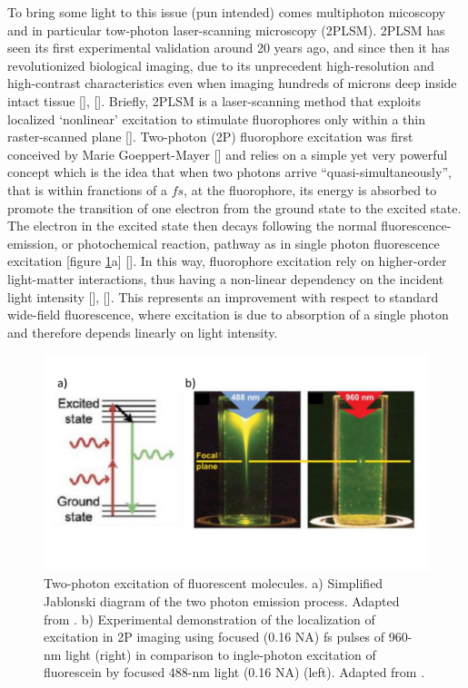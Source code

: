 To bring some light to this issue (pun intended) comes multiphoton micoscopy and in particular tow-photon laser-scanning microscopy (2PLSM).
2PLSM has seen its first experimental validation around 20 years ago, and since then it has revolutionized biological imaging, due to its unprecedent high-resolution and high-contrast characteristics even when imaging hundreds of microns deep inside intact tissue [\cite{denk1994}], [\cite{helmchen2005}].
Briefly, 2PLSM is a laser-scanning method that exploits localized ‘nonlinear’ excitation to stimulate fluorophores only within a thin raster-scanned plane [\cite{zipfel2003}]. 
Two-photon (2P) fluorophore excitation was first conceived by Marie Goeppert-Mayer [\cite{goppertmayer1931}] and relies on a simple yet very powerful concept which is the idea that when two photons arrive \enquote{quasi-simultaneously}, that is within franctions of a $fs$, at the fluorophore, its energy is absorbed to promote the transition of one electron from the ground state to the excited state.
The electron in the excited state then decays following the normal fluorescence-emission, or photochemical reaction, pathway as in single photon fluorescence excitation [figure \ref{fig:chap1:optical_imaging}a] [\cite{pawley2006}].
In this way, fluorophore excitation rely on higher-order light-matter interactions, thus having a non-linear dependency on the incident light intensity [\cite{svoboda2006}], [\cite{helmchen2005}]. 
This represents an improvement with respect to standard wide-field fluorescence, where excitation is due to absorption of a single photon and therefore depends linearly on light intensity. 
\begin{figure}
    \centering
    \includegraphics[width=\textwidth]{Figures/Chapter1/intro_fig_optical_imaging.pdf}
    \caption{Two-photon excitation of fluorescent molecules. a) Simplified Jablonski diagram of the two photon emission process. Adapted from \cite{svoboda2006}. b) Experimental demonstration of the localization of excitation in 2P imaging using focused (0.16 NA) fs pulses of 960-nm light (right) in comparison to ingle-photon excitation of fluorescein by focused 488-nm light (0.16 NA) (left). Adapted from \cite{zipfel2003}.}
    \label{fig:chap1:optical_imaging}
\end{figure}
